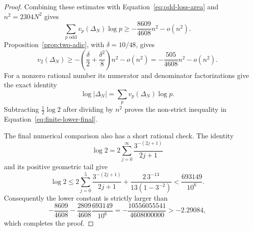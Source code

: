 \begin{proof}
Combining these estimates with Equation~\eqref{eq:odd-loss-area}
and $n^2=2304N^2$ gives
\[
 \sum_{p\text{ odd}}v_p(\Delta_N)\log p
       \ge-\frac{8609}{4608}n^2-o(n^2).
\]
Proposition~\ref{prop:two-adic}, with $\delta=10/48$, gives
\[
 v_2(\Delta_N)\ge
  -\left(\frac\delta2+\frac{\delta^2}{8}\right)n^2-o(n^2)
  =-\frac{505}{4608}n^2-o(n^2).
\]
For a nonzero rational number its numerator and denominator
factorizations give the exact identity
\[
 \log|\Delta_N|=\sum_pv_p(\Delta_N)\log p.
\]
Subtracting $\tfrac12\log2$ after dividing by $n^2$ proves the
non-strict inequality in Equation~\eqref{eq:finite-lower-final}.

The final numerical comparison also has a short rational check.
The identity
\[
 \log2=2\sum_{j=0}^{\infty}\frac{3^{-(2j+1)}}{2j+1}
\]
and its positive geometric tail give
\[
 \log2\le
 2\sum_{j=0}^{5}\frac{3^{-(2j+1)}}{2j+1}
       +\frac{2\,3^{-13}}{13(1-3^{-2})}
 <\frac{693149}{10^6}.
\]
Consequently the lower constant is strictly larger than
\[
 -\frac{8609}{4608}-\frac{2809}{4608}\frac{693149}{10^6}
 =-\frac{10556055541}{4608000000}>-2.29084,
\]
which completes the proof.
\end{proof}
